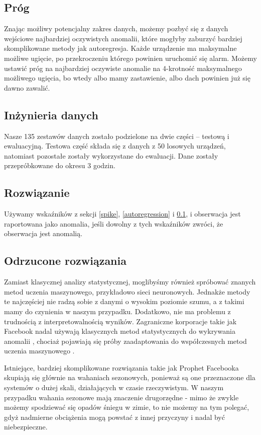 \documentclass[12pt]{article}
\begin{document}
    \subsection{Próg}\label{threshold}
    Znając możliwy potencjalny zakres danych, możemy pozbyć się z danych wejściowe najbardziej oczywistych anomalii,
    które mogłyby zaburzyć bardziej skomplikowane metody jak autoregresja. Każde urządzenie ma maksymalne możliwe
    ugięcie, po przekroczeniu którego powinien uruchomić się alarm. Możemy ustawić próg na najbardziej oczywiste
    anomalie
    na 4-krotność maksymalnego możliwego ugięcia, bo wtedy albo mamy zastawienie, albo dach powinien już się dawno
    zawalić.

    \subsection{Inżynieria danych}
    Nasze 135 zestawów danych zostało podzielone na dwie części -- testową i ewaluacyjną. Testowa część składa się z
    danych z 50 losowych urządzeń, natomiast pozostałe zostały wykorzystane do ewaluacji. Dane zostały przepróbkowane do
    okresu 3 godzin.

    \subsection{Rozwiązanie}\label{solution}
    Używamy wskaźników z sekcji \ref{spike}, \ref{autoregression} i \ref{threshold}, i obserwacja jest raportowana jako
    anomalia, jeśli dowolny z tych wskaźników zwróci, że obserwacja jest anomalią.

    \subsection{Odrzucone rozwiązania}
    Zamiast klasycznej analizy statystycznej, moglibyśmy również spróbować znanych metod uczenia maszynowego,
    przykładowo
    sieci neuronowych. Jednakże metody te najczęściej nie radzą sobie z danymi o wysokim poziomie szumu, a z takimi mamy
    do czynienia w naszym przypadku. Dodatkowo, nie ma problemu z trudnością z interpretowalnością wyników. Zagraniczne
    korporacje takie jak Facebook nadal używają klasycznych metod statystycznych do wykrywania anomalii \cite{Prophet},
    chociaż pojawiają się próby zaadaptowania do współczesnych metod uczenia maszynowego \cite{Neuralprophet}.

    Istniejące, bardziej skomplikowane rozwiązania takie jak Prophet Facebooka \cite{Prophet} skupiają się głównie na
    wahaniach sezonowych, ponieważ są one przeznaczone dla systemów o dużej skali, działających w czasie rzeczywistym. W
    naszym przypadku wahania sezonowe mają znaczenie drugorzędne - mimo że zwykle możemy spodziewać się opadów śniegu w
    zimie, to nie możemy na tym polegać, gdyż nadmierne obciążenia mogą powstać z innej przyczyny i nadal być
    niebezpieczne.
\end{document}
